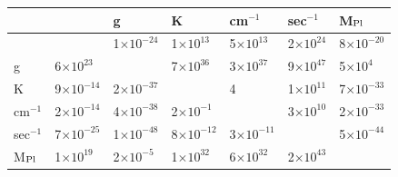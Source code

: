 \documentclass[12pt, oneside]{report}    %
\begin{document}
\begin{table}[ht]
    \renewcommand{\arraystretch}{1.3} %
    \centering
    \begin{tabular}{ @{} lllllll @{} } \toprule %
        & \GeV{} & g & K & cm$^{-1}$ & sec$^{-1}$ & M$_\textnormal{Pl}$
        \\ \midrule
        \GeV{} %
        & %
        & 1$\times 10^{-24}$ %
        & 1$\times 10^{13}$%
        & 5$\times 10^{13}$%
        & 2$\times 10^{24}$%
        & 8$\times 10^{-20}$%
        \\
        g %
        & 6$\times 10^{23}$%
        & %
        & 7$\times 10^{36}$%
        & 3$\times 10^{37}$%
        & 9$\times 10^{47}$%
        & 5$\times 10^{4}$%
        \\
        K%
        & 9$\times 10^{-14}$%
        & 2$\times 10^{-37}$%
        & %
        & 4%
        & 1$\times 10^{11}$%
        & 7$\times 10^{-33}$%
        \\
        cm$^{-1}$ %
        & 2$\times 10^{-14}$%
        & 4$\times 10^{-38}$%
        & 2$\times 10^{-1}$%
        & %
        & 3$\times 10^{10}$%
        & 2$\times 10^{-33}$%
        \\
        sec$^{-1}$ %
        & 7$\times 10^{-25}$%
        & 1$\times 10^{-48}$%
        & 8$\times 10^{-12}$%
        & 3$\times 10^{-11}$%
        & %
        & 5$\times 10^{-44}$%
        \\
        M$_\textnormal{Pl}$%
        & 1$\times 10^{19}$%
        & 2$\times 10^{-5}$%
        & 1$\times 10^{32}$%
        & 6$\times 10^{32}$%
        & 2$\times 10^{43}$%
        & %
        \\ \bottomrule
    \end{tabular}
        \label{table:app:natural:unit:conversion}
\end{table}
\end{document}
